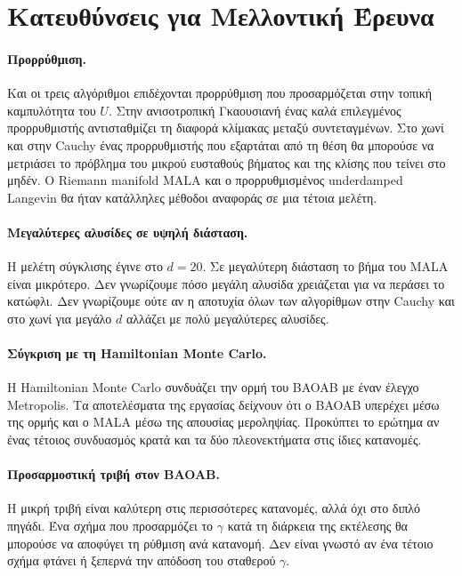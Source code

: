 \section{Κατευθύνσεις για Μελλοντική Έρευνα}
\label{sec:concl-future}

\paragraph{Προρρύθμιση.}
Και οι τρεις αλγόριθμοι επιδέχονται προρρύθμιση που προσαρμόζεται στην τοπική
καμπυλότητα του $U$. Στην ανισοτροπική Γκαουσιανή ένας καλά επιλεγμένος προρρυθμιστής
αντισταθμίζει τη διαφορά κλίμακας μεταξύ συντεταγμένων. Στο χωνί και στην Cauchy ένας
προρρυθμιστής που εξαρτάται από τη θέση θα μπορούσε να μετριάσει το πρόβλημα του
μικρού ευσταθούς βήματος και της κλίσης που τείνει στο μηδέν. Ο Riemann manifold MALA
\citep{girolami2011riemann} και ο προρρυθμισμένος underdamped Langevin θα ήταν κατάλληλες
μέθοδοι αναφοράς σε μια τέτοια μελέτη.

\paragraph{Μεγαλύτερες αλυσίδες σε υψηλή διάσταση.}
Η μελέτη σύγκλισης έγινε στο $d=20$. Σε μεγαλύτερη διάσταση το βήμα του MALA είναι
μικρότερο. Δεν γνωρίζουμε πόσο μεγάλη αλυσίδα χρειάζεται για να περάσει το
κατώφλι. Δεν γνωρίζουμε ούτε αν η αποτυχία όλων των αλγορίθμων στην Cauchy και στο χωνί για μεγάλο $d$
αλλάζει με πολύ μεγαλύτερες αλυσίδες.

\paragraph{Σύγκριση με τη Hamiltonian Monte Carlo.}
Η Hamiltonian Monte Carlo \citep{neal2011mcmc} συνδυάζει την ορμή του BAOAB με έναν
έλεγχο Metropolis. Τα αποτελέσματα της εργασίας δείχνουν ότι ο BAOAB υπερέχει μέσω της ορμής και ο
MALA μέσω της απουσίας μεροληψίας. Προκύπτει το ερώτημα αν ένας τέτοιος
συνδυασμός κρατά και τα δύο πλεονεκτήματα στις ίδιες κατανομές.

\paragraph{Προσαρμοστική τριβή στον BAOAB.}
Η μικρή τριβή είναι καλύτερη στις περισσότερες κατανομές, αλλά όχι στο διπλό πηγάδι.
Ένα σχήμα που προσαρμόζει το $\gamma$ κατά τη διάρκεια της εκτέλεσης θα μπορούσε να
αποφύγει τη ρύθμιση ανά κατανομή. Δεν είναι γνωστό αν ένα τέτοιο σχήμα φτάνει ή ξεπερνά
την απόδοση του σταθερού $\gamma$.
